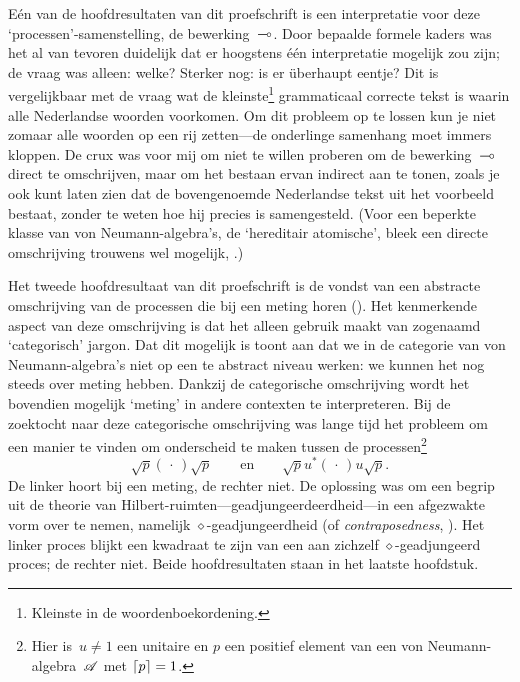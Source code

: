 \documentclass[b5paper]{book}
\begin{document}
E\'en van de hoofdresultaten van dit proefschrift
is een interpretatie voor deze `processen'-samenstelling,
de bewerking~$\mathbin{\multimap}$.
Door bepaalde formele kaders
was het al van tevoren duidelijk dat er hoogstens \'e\'en
interpretatie mogelijk zou zijn;
de vraag was alleen: welke?  Sterker nog: is er \"uberhaupt eentje?
Dit is vergelijkbaar met de vraag wat de kleinste\footnote{Kleinste
in de woordenboekordening.}
grammaticaal
correcte tekst is waarin
alle Nederlandse woorden voorkomen.
Om dit probleem op te lossen kun je niet zomaar alle woorden
op een rij zetten---de onderlinge samenhang moet immers kloppen.
De crux was voor mij om niet te willen proberen om de bewerking~$\mathbin{\multimap}$ 
direct te omschrijven,
maar om het bestaan ervan indirect aan te tonen,
zoals je ook kunt laten zien dat de  bovengenoemde Nederlandse tekst
uit het voorbeeld bestaat,
zonder te weten hoe hij precies is samengesteld.
(Voor een beperkte klasse van
von Neumann-algebra's, de `hereditair atomische', bleek een
directe omschrijving trouwens wel mogelijk, .)

Het tweede hoofdresultaat van dit proefschrift
is de vondst van een abstracte omschrijving
van de processen
die bij een meting horen ().
Het kenmerkende aspect van deze omschrijving is dat
het alleen gebruik maakt van zogenaamd `categorisch' jargon.
Dat dit mogelijk is toont aan
dat we in de categorie van von Neumann-algebra's
niet op een te abstract niveau werken:
we kunnen het nog steeds over meting hebben.
Dankzij de  categorische omschrijving  wordt het bovendien
mogelijk `meting' in andere contexten  te interpreteren.
Bij de zoektocht naar deze categorische omschrijving
was lange tijd het probleem om
een manier te vinden
om onderscheid te maken tussen de processen\footnote{Hier is~$u\neq 1$
een  unitaire
en 
$p$ een positief element van een von Neumann-algebra~$\mathscr{A}$
met $\left\lceil p\right\rceil=1$.}
\begin{equation*}
\sqrt{p}(\,\cdot\,)\sqrt{p}\qquad\text{en}\qquad
\sqrt{p}u^*(\,\cdot\,)u \sqrt{p}.
\end{equation*}
De linker hoort bij een meting, de rechter niet.
De oplossing was om een begrip uit de theorie 
van Hilbert-ruimten---geadjungeerdeerdheid---in een 
afgezwakte vorm over te nemen, namelijk $\diamond$-geadjungeerdheid 
(of \emph{contraposedness}, ).
Het linker proces blijkt een kwadraat te zijn van een aan zichzelf
$\diamond$-geadjungeerd proces; de rechter niet.
Beide hoofdresultaten staan in het laatste hoofdstuk.
\end{document}
